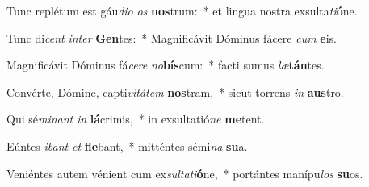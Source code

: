 \item Tunc replétum est gáu\textit{di}\textit{o} \textit{os} \textbf{nos}trum:~* et lingua nostra exsulta\textit{ti}\textbf{ó}ne.
\item Tunc di\textit{cent} \textit{in}\textit{ter} \textbf{Gen}tes:~* Magnificávit Dóminus fácere \textit{cum} \textbf{e}is.
\item Magnificávit Dóminus fá\textit{ce}\textit{re} \textit{no}\textbf{bís}cum:~* facti sumus \textit{læ}\textbf{tán}tes.
\item Convérte, Dómine, capti\textit{vi}\textit{tá}\textit{tem} \textbf{nos}tram,~* sicut torrens \textit{in} \textbf{aus}tro.
\item Qui sé\textit{mi}\textit{nant} \textit{in} \textbf{lá}crimis,~* in exsultatió\textit{ne} \textbf{me}tent.
\item Eúntes \textit{i}\textit{bant} \textit{et} \textbf{fle}bant,~* mitténtes sémi\textit{na} \textbf{su}a.
\item Veniéntes autem vénient cum ex\textit{sul}\textit{ta}\textit{ti}\textbf{ó}ne,~* portántes manípu\textit{los} \textbf{su}os.
